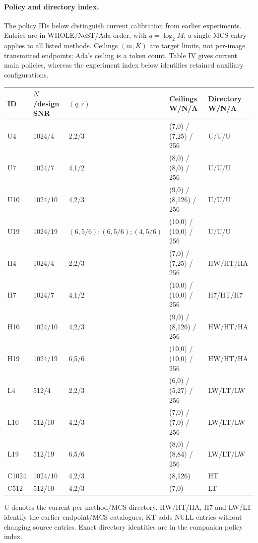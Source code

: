 \documentclass[10pt,letterpaper]{article}
\begin{document}
\paragraph{Policy and directory index.}
The policy IDs below distinguish current calibration from earlier experiments. Entries are in WHOLE/NeST/Ada order, with $q=\log_2 M$; a single MCS entry applies to all listed methods. Ceilings $(m,K)$ are target limits, not per-image transmitted endpoints; Ada's ceiling is a token count. Table IV gives current main policies, whereas the experiment index below identifies retained auxiliary configurations.
{\small\setlength{\tabcolsep}{3pt}\begin{longtable}{@{}lllp{4.3cm}l@{}}\toprule
ID & $N$/design SNR & $(q,r)$ & Ceilings W/N/A & Directory W/N/A\\\midrule\endhead
U4 & 1024/4 & 2,2/3 & (7,0) / (7,25) / 256 & U/U/U\\
U7 & 1024/7 & 4,1/2 & (8,0) / (8,0) / 256 & U/U/U\\
U10 & 1024/10 & 4,2/3 & (9,0) / (8,126) / 256 & U/U/U\\
U19 & 1024/19 & $(6,5/6);(6,5/6);(4,5/6)$ & (10,0) / (10,0) / 256 & U/U/U\\
H4 & 1024/4 & 2,2/3 & (7,0) / (7,25) / 256 & HW/HT/HA\\
H7 & 1024/7 & 4,1/2 & (10,0) / (10,0) / 256 & H7/HT/H7\\
H10 & 1024/10 & 4,2/3 & (9,0) / (8,126) / 256 & HW/HT/HA\\
H19 & 1024/19 & 6,5/6 & (10,0) / (10,0) / 256 & HW/HT/HA\\
L4 & 512/4 & 2,2/3 & (6,0) / (5,27) / 256 & LW/LT/LW\\
L10 & 512/10 & 4,2/3 & (7,0) / (7,0) / 256 & LW/LT/LW\\
L19 & 512/19 & 6,5/6 & (8,0) / (8,84) / 256 & LW/LT/LW\\
C1024 & 1024/10 & 4,2/3 & (8,126) & HT\\
C512 & 512/10 & 4,2/3 & (7,0) & LT\\
\bottomrule\end{longtable}}
U denotes the current per-method/MCS directory. HW/HT/HA, H7 and LW/LT identify the earlier endpoint/MCS catalogues; KT adds NULL entries without changing source entries. Exact directory identities are in the companion policy index.
\end{document}
